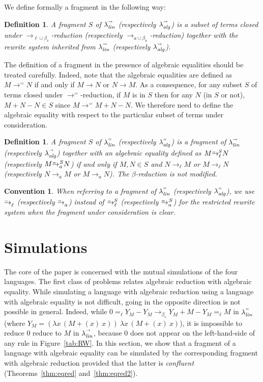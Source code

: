 \documentclass{LMCS}
\newtheorem{definition}[theorem]{Definition}
\newtheorem{convention}[theorem]{Convention}
\newcommand{\xllin}[1]{\ensuremath{\lambda^{\raisebox{0.5ex}{\textrm{\tiny $#1$}}}_{{\it lin}}}}
\newcommand{\xlalg}[1]{\ensuremath{\lambda^{\raisebox{0.5ex}{\textrm{\tiny $#1$}}}_{{\it alg}}}}
\newcommand{\llinred}{\xllin{\rightarrow}}
\newcommand{\lalgred}{\xlalg{\rightarrow}}
\newcommand{\llineq}{\xllin{=}}
\newcommand{\lalgeq}{\xlalg{=}}
\newcommand{\xto}[1]{\ensuremath{\rightarrow_{#1}}}
\newcommand{\simxto}[1]{\ensuremath{\rightarrow_{#1}^{\hspace{-2.2ex}\textrm{\tiny=}}}}
\newcommand{\fragment}[2]{\ensuremath{{#2}^{\hspace{-1ex}#1}}}
\newcommand{\tolinred}{\xto{\ell}}
\newcommand{\toalgred}{\xto{a}}
\newcommand{\tolineq}{\simxto{\ell}}
\newcommand{\toalgeq}{\simxto{a}}
\newcommand{\tobv}{\xto{\beta_v}}
\newcommand{\toblinred}{\xto{\ell\cup\beta_v}}
\newcommand{\tobalgred}{\xto{a\cup\beta_n}}
\begin{document}
We define formally a fragment in the following way:
\begin{definition}\label{def:subset} 
  A \emph{fragment} $S$ of $\llinred$ (respectively $\lalgred$) is a subset of terms closed under $\toblinred$-reduction (respectively $\tobalgred$-reduction) together with the rewrite system inherited from $\llinred$ (respectively $\lalgred$).
\end{definition}

The definition of a fragment in the presence of algebraic equalities
should be treated carefully. Indeed, note that the algebraic
equalities are defined as $M\to^=N$ if and only if $M\to N$ or $N\to
M$. As a consequence, for any subset $S$ of terms closed under
$\to^=$-reduction, if $M$ is in $S$ then for any $N$ (in $S$ or not),
$M+N-N\in S$ since $M\to^= M+N-N$. We therefore need to define the algebraic
equality with respect to the particular subset of terms under consideration.

\begin{definition}\label{def:subeq}
  A \emph{fragment} $S$ of $\llineq$ (respectively $\lalgeq$) is a fragment of
  $\llinred$ (respectively $\lalgred$) together with an algebraic equality
  defined as $M\fragment{S}{\tolineq} N$ (respectively $M\fragment{S}{\toalgeq} N$) if and only if
  $M,N\in S$ and $N\tolinred M $ or $M\tolinred N$ (respectively $N\toalgred
  M $ or $M\toalgred
  N$). The $\beta$-reduction is not modified.
\end{definition}

\begin{convention}
  When referring to a fragment of $\llineq$ (respectively $\lalgeq$), we use $\tolineq$
  (respectively $\toalgeq$) instead of $\fragment{S}{\tolineq}$ (respectively $\fragment{S}{\toalgeq}$) for the
  restricted rewrite system when the fragment under consideration is clear.
\end{convention}





\section{Simulations}\label{sec:sim}

The core of the paper is concerned with the mutual simulations of the
four languages. 
The first class of problems relates algebraic reduction with algebraic
equality. While simulating a language with algebraic reduction using a
language with algebraic equality is not difficult, going in
the opposite direction is not possible in general. Indeed, while $0
=_\ell Y_M - Y_M \tobv Y_M + M - Y_M =_\ell M$ in
$\llineq$ (where $Y_M=(\lambda x\,(M+(x)~x))~\lambda x\,(M+(x)~x)$),
it is impossible to reduce $0$ reduce to $M$ in $\llinred$, because
$0$ does not appear on the left-hand-side of any rule in
Figure~\ref{tab:RW}. 
In this section, we show that a fragment
of a language with algebraic equality can be simulated by the
corresponding fragment with algebraic reduction provided that the
latter is {\em confluent} (Theorems~\ref{thm:eqred} and~\ref{thm:eqred2}).
\end{document}
